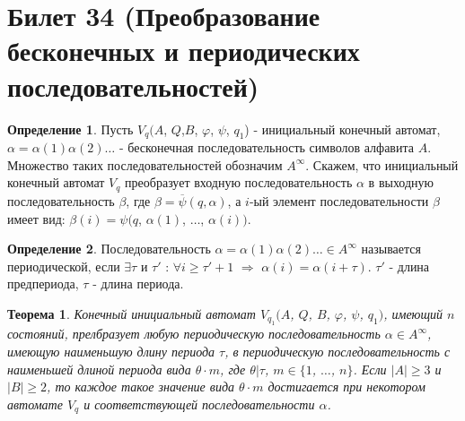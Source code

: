 \documentclass[a4paper, 12pt]{article}
\renewcommand{\phi}{\varphi}
\theoremstyle{definition}
\newtheorem*{definition}{Определение}
\theoremstyle{plain}
\newtheorem*{theorem}{Теорема}
\theoremstyle{remark}
\begin{document}
  \section{Билет 34 (Преобразование бесконечных и периодических последовательностей)}
  \begin{definition}
    Пусть $V_q(A$, $Q$,$B$, $\phi$, $\psi$, $q_1$) - инициальный конечный автомат, $\alpha=\alpha(1)\alpha(2)\ldots$ - бесконечная последовательность символов алфавита $A$. Множество таких последовательностей обозначим $A^{\infty}$. Скажем, что инициальный конечный автомат $V_q$ преобразует входную последовательность $\alpha$ в выходную последовательность $\beta$, где $\beta=\overline{\psi}(q,\alpha)$, а $i$-ый элемент последовательности $\beta$ имеет вид: $\beta(i)=\psi(q$, $\alpha(1)$, $\ldots$, $\alpha(i))$.
  \end{definition}
  \begin{definition}
    Последовательность $\alpha=\alpha(1)\alpha(2)\ldots\in A^{\infty}$ называется периодической, если $\exists\tau$ и $\tau'$ : $\forall i\geqslant\tau'+1$ $\Longrightarrow$ $\alpha(i)=\alpha(i+\tau)$. $\tau'$ - длина предпериода, $\tau$ - длина периода.
  \end{definition}
  \begin{theorem}
    Конечный инициальный автомат $V_{q_1}(A$, $Q$, $B$, $\phi$, $\psi$, $q_1)$, имеющий $n$ состояний, прелбразует любую периодическую последовательность $\alpha\in A^{\infty}$, имеющую наименьшую длину периода $\tau$, в периодическую последовательность с наименьшей длиной периода вида $\theta\cdot m$, где $\theta|\tau$, $m\in \{1$, $\ldots$, $n\}$. Если $|A|\geqslant3$ и $|B|\geqslant2$, то каждое такое значение вида $\theta\cdot m$ достигается при некотором автомате $V_q$ и соответствующей последовательности $\alpha$.
  \end{theorem}
\end{document}
